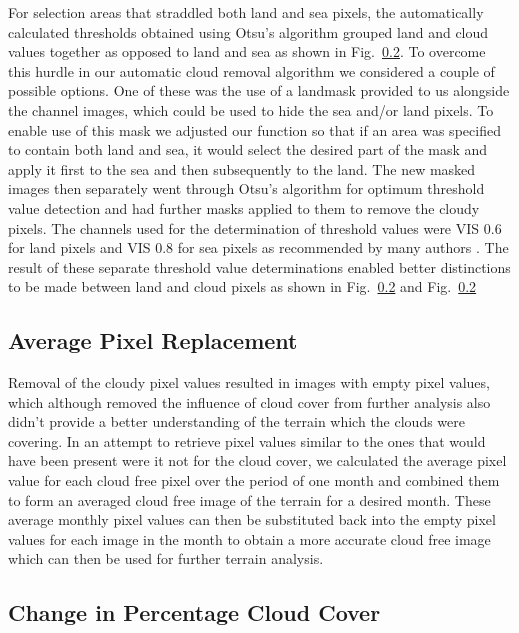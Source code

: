 For selection areas that straddled both land and sea pixels, the automatically calculated thresholds obtained using Otsu's algorithm grouped land and cloud values together as opposed to land and sea as shown in Fig.~\ref{}. %
To overcome this hurdle in our automatic cloud removal algorithm we considered a couple of possible options. One of these was the use of a landmask provided to us alongside the channel images, which could be used to hide the sea and/or land pixels. To enable use of this mask we adjusted our function so that if an area was specified to contain both land and sea, it would select the desired part of the mask and apply it first to the sea and then subsequently to the land. The new masked images then separately went through Otsu's algorithm for optimum threshold value detection and had further masks applied to them to remove the cloudy pixels. The channels used for the determination of threshold values were VIS 0.6 for land pixels and VIS 0.8 for sea pixels as recommended by many authors \cite{}. 
The result of these separate threshold value determinations enabled better distinctions to be made between land and cloud pixels as shown in Fig.~\ref{} and Fig.~\ref{}

\subsection{Average Pixel Replacement}

Removal of the cloudy pixel values resulted in images with empty pixel values, which although removed the influence of cloud cover from further analysis also didn't provide a better understanding of the terrain which the clouds were covering. In an attempt to retrieve pixel values similar to the ones that would have been present were it not for the cloud cover, we calculated the average pixel value for each cloud free pixel over the period of one month and combined them to form an averaged cloud free image of the terrain for a desired month. These average monthly pixel values can then be substituted back into the empty pixel values for each image in the month to obtain a more accurate cloud free image which can then be used for further terrain analysis.

\subsection{Change in Percentage Cloud Cover}

